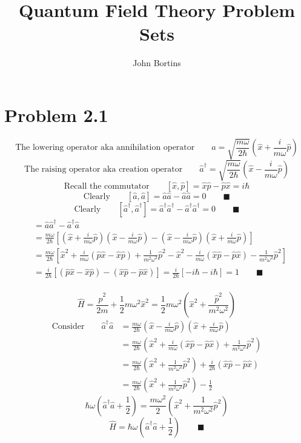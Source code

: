 \documentclass{amsart}
\title{Quantum Field Theory Problem Sets}
\author{John Bortins}
\begin{document}
 
\maketitle{}
 
\section*{Problem 2.1}

\[\text{The lowering operator aka annihilation operator}\qquad\hat{a}  = \sqrt{\frac{m\omega}{2\hbar}}\left(\hat{x} + \frac{i}{m\omega}\hat{p}\right)  \]
\[\text{The raising operator aka creation operator}\qquad\hat{a}^\dagger  = \sqrt{\frac{m\omega}{2\hbar}}\left(\hat{x} - \frac{i}{m\omega}\hat{p}\right)  \]
\[\text{Recall the commutator}\qquad[\hat{x},\hat{p}]  = \hat{x}\hat{p}-\hat{p}\hat{x}=i\hbar \]
\[\text{Clearly}\qquad [\hat{a},\hat{a}]  = \hat{a}\hat{a}-\hat{a}\hat{a}=0 \qquad \blacksquare \]
\[\text{Clearly}\qquad [\hat{a}^\dagger,\hat{a}^\dagger]  = \hat{a}^\dagger\hat{a}^\dagger-\hat{a}^\dagger\hat{a}^\dagger=0 \qquad \blacksquare \]
\begin{align*}
    [\hat{a},\hat{a}^\dagger] &= \hat{a}\hat{a}^\dagger-\hat{a}^\dagger\hat{a}\\
    &= \frac{m\omega}{2\hbar}\left[\left(\hat{x} + \frac{i}{m\omega}\hat{p}\right)\left(\hat{x} - \frac{i}{m\omega}\hat{p}\right)-\left(\hat{x} - \frac{i}{m\omega}\hat{p}\right)\left(\hat{x} + \frac{i}{m\omega}\hat{p}\right)\right]\\
    &= \frac{m\omega}{2\hbar}\left[\hat{x}^2 + \frac{i}{m\omega}(\hat{p}\hat{x}-\hat{x}\hat{p}) + \frac{1}{m^2\omega^2}\hat{p}^2-\hat{x}^2 - \frac{i}{m\omega}(\hat{x}\hat{p}-\hat{p}\hat{x}) - \frac{1}{m^2\omega^2}\hat{p}^2\right]\\
    &= \frac{i}{2\hbar}\left[ (\hat{p}\hat{x}-\hat{x}\hat{p}) - (\hat{x}\hat{p}-\hat{p}\hat{x})\right]= \frac{i}{2\hbar}\left[-i\hbar-i\hbar\right]=1 \qquad\blacksquare\\
\end{align*}

\[\hat{H}=\frac{\hat{p}^2}{2m}+\frac{1}{2}m\omega^2\hat{x}^2=\frac{1}{2}m\omega^2\left(\hat{x}^2+\frac{\hat{p}^2}{m^2\omega^2}\right) \]
\begin{align*}
    \text{Consider}\qquad \hat{a}^\dagger \hat{a} &=\frac{m\omega}{2\hbar}\left(\hat{x} - \frac{i}{m\omega}\hat{p}\right)\left(\hat{x} + \frac{i}{m\omega}\hat{p}\right)\\
    &=\frac{m\omega}{2\hbar}\left(\hat{x}^2 + \frac{i}{m\omega}(\hat{x}\hat{p}-\hat{p}\hat{x}) + \frac{1}{m^2\omega^2}\hat{p}^2\right)\\
    &=\frac{m\omega}{2\hbar}\left(\hat{x}^2 + \frac{1}{m^2\omega^2}\hat{p}^2\right) + \frac{i}{2\hbar}(\hat{x}\hat{p}-\hat{p}\hat{x})\\
    &=\frac{m\omega}{2\hbar}\left(\hat{x}^2 + \frac{1}{m^2\omega^2}\hat{p}^2\right) - \frac{1}{2}
\end{align*}
\[\hbar\omega\left(\hat{a}^\dagger \hat{a} +\frac{1}{2}\right)=\frac{m\omega^2}{2}\left(\hat{x}^2 + \frac{1}{m^2\omega^2}\hat{p}^2\right)   \]
\[\hat{H}=\hbar\omega\left(\hat{a}^\dagger \hat{a} +\frac{1}{2}\right)\qquad\blacksquare \]
\end{document}
